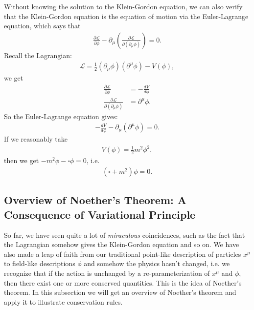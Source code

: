 \documentclass[a4paper,11pt]{article}
\numberwithin{equation}{section}
\theoremstyle{definition}
\newcommand{\p}{\partial}
\newcommand{\lag}{\mathcal{L}}
\begin{document}
Without knowing the solution to the Klein-Gordon equation, we can also verify that the Klein-Gordon equation is the equation of motion via the Euler-Lagrange equation, which says that
\begin{align*}
\frac{\p \lag}{\p \phi} - \p_\mu\left( \frac{\p \lag}{\p(\p_\mu \phi)} \right) = 0.
\end{align*}
Recall the Lagrangian:
\begin{align*}
\lag = \frac{1}{2}(\p_\mu\phi)(\p^\mu\phi) - V(\phi),
\end{align*}
we get
\begin{align*}
\frac{\p\lag}{\p\phi} &= -\frac{dV}{d\phi}\\
\frac{\p\lag}{\p(\p_\mu\phi)} &= \p^\mu\phi.
\end{align*}
So the Euler-Lagrange equation gives:
\begin{align*}
-\frac{dV}{d\phi} - \p_\mu(\p^\mu\phi) = 0.
\end{align*}
If we reasonably take
\begin{align*}
V(\phi) = \frac{1}{2}m^2\phi^2,
\end{align*}
then we get $-m^2\phi - \square \phi = 0$, i.e.
\begin{align*}
(\square + m^2)\phi = 0.
\end{align*}

\subsection{Overview of Noether's Theorem: A Consequence of Variational Principle}
So far, we have seen quite a lot of \textit{miraculous} coincidences, such as the fact that the Lagrangian somehow gives the Klein-Gordon equation and so on. We have also made a leap of faith from our traditional point-like description of particles $x^\mu$ to field-like descriptions $\phi$ and somehow the physics hasn't changed, i.e. we recognize that if the action is unchanged by a re-parameterization of $x^\mu$ and $\phi$, then there exist one or more conserved quantities. This is the idea of Noether's theorem. In this subsection we will get an overview of Noether's theorem and apply it to illustrate conservation rules.\\
\end{document}
